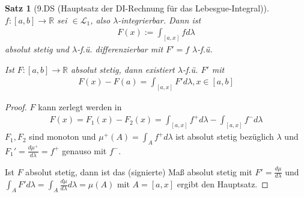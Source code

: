 \documentclass[]{article}
\newtheorem{theorem}{Satz}
\begin{document}
\begin{theorem}[9.DS (Hauptsatz der DI-Rechnung für das Lebesgue-Integral)]
	$f:[a,b]\rightarrow\mathbb{R}$ sei $\in \mathcal{L}_1$, also $\lambda$-integrierbar. Dann ist
	\begin{align*}
		F(x) := \int_{[a,x]} f d\lambda
	\end{align*}
	absolut stetig und $\lambda$-f.ü. differenzierbar mit $F'=f$ $\lambda$-f.ü.
	
	Ist $F:[a,b]\rightarrow\mathbb{R}$ absolut stetig, dann existiert $\lambda$-f.ü. $F'$ mit
	\begin{align*}
		F(x)-F(a) = \int_{[a,x]} F' d\lambda, x\in [a,b]
	\end{align*}
\end{theorem}

\begin{proof}
	$F$ kann zerlegt werden in
	\begin{align*}
		F(x) = F_1(x) - F_2(x) = \int_{[a,x]} f^+ d\lambda - \int_{[a,x]} f^- d\lambda
	\end{align*}
	$F_1,F_2$ sind monoton und $\mu^+(A) = \int_A f^+ d\lambda$ ist absolut stetig bezüglich $\lambda$ und $F_1' = \frac{d\mu^+}{d\lambda} = f^+$ genauso mit $f^-$.
	
	Ist $F$ absolut stetig, dann ist das (signierte) Maß absolut stetig mit $F'=\frac{d\mu}{d\lambda}$ und $\int_A F' d\lambda = \int_A \frac{d\mu}{d\lambda} d\lambda = \mu(A)$ mit $A=[a,x]$ ergibt den Hauptsatz.
\end{proof}
\end{document}
